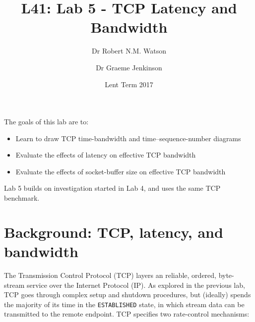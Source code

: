 \documentclass[a4paper,10pt]{article}
\begin{document}
\title{L41: Lab 5 - TCP Latency and Bandwidth}
\author{Dr Robert N.M. Watson \and Dr Graeme Jenkinson}
\date{Lent Term 2017}
\maketitle

\noindent
The goals of this lab are to:

\begin{itemize}
\item Learn to draw TCP time-bandwidth and time--sequence-number diagrams
\item Evaluate the effects of latency on effective TCP bandwidth
\item Evaluate the effects of socket-buffer size on effective TCP bandwidth
\end{itemize}

\noindent
Lab 5 builds on investigation started in Lab 4, and uses the same TCP
benchmark.

\section*{Background: TCP, latency, and bandwidth}

The Transmission Control Protocol (TCP) layers an reliable, ordered,
byte-stream service over the Internet Protocol (IP).
As explored in the previous lab, TCP goes through complex setup and shutdown
procedures, but (ideally) spends the majority of its time in the
\texttt{ESTABLISHED} state, in which stream data can be transmitted to the
remote endpoint.
TCP specifies two rate-control mechanisms:
\end{document}
